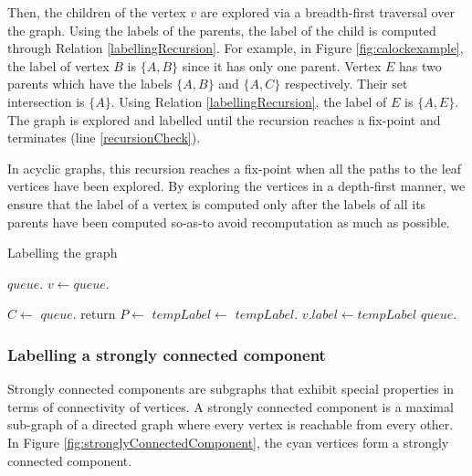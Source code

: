 Then, the children of the vertex $v$ are explored via a breadth-first traversal over the graph. Using the labels of the parents, the label of the child is computed through Relation \ref{labellingRecursion}. For example, in Figure \ref{fig:calockexample}, the label of vertex $B$ is $\{A, B\}$ since it has only one parent. Vertex $E$ has two parents which have the labels $\{A, B\}$ and $\{A, C\}$ respectively. Their set intersection is $\{A\}$. Using Relation \ref{labellingRecursion}, the label of $E$ is $\{A, E\}$. The graph is explored and labelled until the recursion reaches a fix-point and terminates (line \ref{recursionCheck}). 

In acyclic graphs, this recursion reaches a fix-point when all the paths to the leaf vertices have been explored. By exploring the vertices in a depth-first manner, we ensure that the label of a vertex is computed only after the labels of all its parents have been computed so-as-to avoid recomputation as much as possible.


\begin{algorithm}[h]
	\caption{Labelling the graph}
	\begin{algorithmic}[1]
		\State $queue$.
		\State $v\gets queue.$
		\State {}
		\EndWhile
		\EndProcedure
		\Statex

		\State $C\gets$
		 \label{rootLabellingBegin}
		\State $queue.$
		\State return
		\EndIf\label{rootLabellingEnd}
		\State $P\gets$\label{labellingRelationImplBegin}
		\State $tempLabel\gets$\label{intersectionStart}
		\State $tempLabel$. \label{intersectionEnd}
		 \label{recursionCheck}
		\State $v.label\gets tempLabel$
		\State $queue.$
		\EndIf \label{labellingRelationImplEnd}
		\EndProcedure
	\end{algorithmic}
	\label{labelAssignment}
\end{algorithm}


\subsubsection{Labelling a strongly connected component}
Strongly connected components are subgraphs that exhibit special properties in terms of connectivity of vertices. 
A strongly connected component is a maximal sub-graph of a directed graph where every vertex is reachable from every other. 
In Figure \ref{fig:stronglyConnectedComponent}, the cyan vertices form a strongly connected component.



